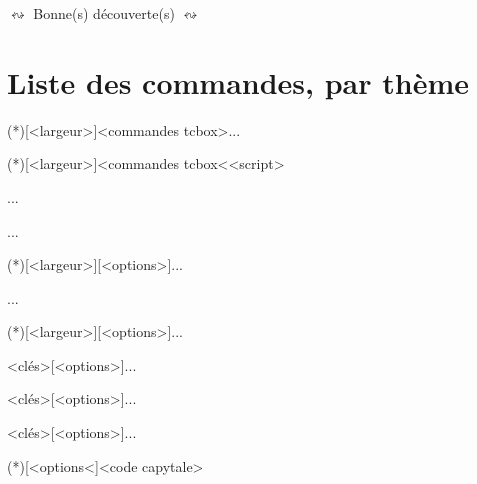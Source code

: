 \documentclass{article}
\begin{document}
\vfill

\hfill{\Huge $\leftrightsquigarrow$ Bonne(s) découverte(s) $\leftrightsquigarrow$}\hfill~

\vfill

\newpage

\part{Liste des commandes, par thème}

\begin{codetex}
\splinetikz[<options>]
\tangentetikz[<options>]


\paramCF[<options>]
\end{codetex}

\begin{codetex}
\begin{envcodepython}(*)[<largeur>]{<commandes tcbox>}...\end{envcodepython}
\envcodepythonfichier(*)[<largeur>]{<commandes tcbox<}{<script>}
\begin{envcodepiton}[<options>]...\end{envcodepiton}
\begin{envcodepythontex}[<options>]...\end{envcodepythontex}
\begin{envcodepythonminted}(*)[<largeur>][<options>]...\end{envcodepythonminted}

\begin{envconsolepythontex}[<options>]...\end{envconsolepythontex}

\begin{envpseudocode}(*)[<largeur>][<options>]...\end{envpseudocode}

\begin{PLtermwin}[<largeur>]{<clés>}[<options>]...\end{PLtermwin}
\begin{PLtermunix}[<largeur>]{<clés>}[<options>]...\end{PLtermunix}
\begin{PLtermosx}[<largeur>]{<clés>}[<options>]...\end{PLtermosx}

\liencapytale(*)[<options<]{<code capytale>}
\end{codetex}
\end{document}

